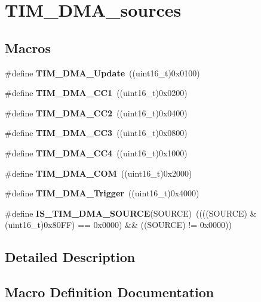 \section{T\+I\+M\+\_\+\+D\+M\+A\+\_\+sources}
\label{group__TIM__DMA__sources}
\subsection*{Macros}
\begin{DoxyCompactItemize}
\item 
\#define \textbf{ T\+I\+M\+\_\+\+D\+M\+A\+\_\+\+Update}~((uint16\+\_\+t)0x0100)
\item 
\#define \textbf{ T\+I\+M\+\_\+\+D\+M\+A\+\_\+\+C\+C1}~((uint16\+\_\+t)0x0200)
\item 
\#define \textbf{ T\+I\+M\+\_\+\+D\+M\+A\+\_\+\+C\+C2}~((uint16\+\_\+t)0x0400)
\item 
\#define \textbf{ T\+I\+M\+\_\+\+D\+M\+A\+\_\+\+C\+C3}~((uint16\+\_\+t)0x0800)
\item 
\#define \textbf{ T\+I\+M\+\_\+\+D\+M\+A\+\_\+\+C\+C4}~((uint16\+\_\+t)0x1000)
\item 
\#define \textbf{ T\+I\+M\+\_\+\+D\+M\+A\+\_\+\+C\+OM}~((uint16\+\_\+t)0x2000)
\item 
\#define \textbf{ T\+I\+M\+\_\+\+D\+M\+A\+\_\+\+Trigger}~((uint16\+\_\+t)0x4000)
\item 
\#define \textbf{ I\+S\+\_\+\+T\+I\+M\+\_\+\+D\+M\+A\+\_\+\+S\+O\+U\+R\+CE}(S\+O\+U\+R\+CE)~((((S\+O\+U\+R\+CE) \& (uint16\+\_\+t)0x80\+F\+F) == 0x0000) \&\& ((\+S\+O\+U\+R\+C\+E) != 0x0000))
\end{DoxyCompactItemize}


\subsection{Detailed Description}


\subsection{Macro Definition Documentation}
\mbox{\label{group__TIM__DMA__sources_gafb9cb1995ea4cd37db6032d80a49cd47}} 
